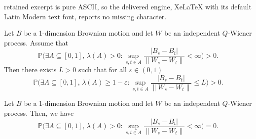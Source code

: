 \documentclass[10pt,a4paper]{amsart}
\renewcommand{\epsilon}{\varepsilon}
\begin{document}
retained excerpt is pure ASCII, so the delivered engine, XeLaTeX with its default Latin Modern text font, reports no missing character.
\begin{lemma} \label{lem:non.zero}
    Let $B$ be a 1-dimension Brownian motion and let $W$ be an independent $Q$-Wiener process.
    Assume that
    \begin{equation}
    \label{eq:non.zero}
        \mathbb P\Big( \exists A \subseteq [0,1], \, \lambda(A) > 0 : \sup_{s,t \in A} \frac{|B_s - B_t|}{\|W_s - W_t\|} < \infty \Big) > 0.
    \end{equation}
    Then there exists $L > 0$ such that for all $\epsilon \in (0,1)$
    \[
        \mathbb P\Big( \exists A \subseteq [0,1], \, \lambda(A) \ge 1 - \epsilon : \sup_{s,t \in A} \frac{|B_s - B_t|}{\|W_s - W_t\|} \le L  \Big) > 0.
    \]
\end{lemma}

\begin{theorem} \label{thm:nolip}
    Let $B$ be a 1-dimension Brownian motion and let $W$ be an independent $Q$-Wiener process.
    Then, we have
    \begin{equation}
        \label{eq:thm.nolip}
        \mathbb P\Big( \exists A \subseteq [0,1], \, \lambda(A) > 0 : \sup_{s,t \in A} \frac{|B_s - B_t|}{\|W_s - W_t\|} < \infty \Big) = 0.
    \end{equation}
\end{theorem}
\end{document}
